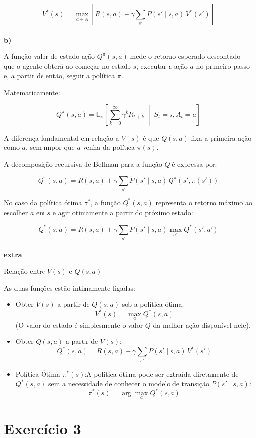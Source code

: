 \documentclass[a4paper,12pt]{article}
\begin{document}
$$V^*(s) = \max_{a \in A} \left[ R(s, a) + \gamma \sum_{s'} P(s' \mid s, a) \, V^*(s') \right]$$\\

\textbf{b)}

A função valor de estado-ação $Q^\pi(s, a)$ mede o retorno esperado descontado que o agente obterá ao começar no estado $s$, executar a ação $a$ no primeiro passo e, a partir de então, seguir a política $\pi$.

Matematicamente:

$$Q^\pi(s, a) = \mathbb{E}_\pi \left[ \sum_{k=0}^{\infty} \gamma^k R_{t+k} \;\middle\vert{}\; S_t = s, A_t = a \right]$$

A diferença fundamental em relação a $V(s)$ é que $Q(s,a)$ fixa a primeira ação como $a$, sem impor que $a$ venha da política $\pi(s)$.

A decomposição recursiva de Bellman para a função $Q$ é expressa por:

$$Q^\pi(s, a) = R(s, a) + \gamma \sum_{s'} P(s' \mid s, a) \, Q^\pi(s', \pi(s'))$$

No caso da política ótima $\pi^*$, a função $Q^*(s, a)$ representa o retorno máximo ao escolher $a$ em $s$ e agir otimamente a partir do próximo estado:

$$Q^*(s, a) = R(s, a) + \gamma \sum_{s'} P(s' \mid s, a) \max_{a'} Q^*(s', a')$$\\

\textbf{extra}

Relação entre $V(s)$ e $Q(s,a)$

As duas funções estão intimamente ligadas:
\begin{itemize}
	\item Obter $V(s)$ a partir de $Q(s,a)$ sob a política ótima:$$V^*(s) = \max_{a} Q^*(s, a)$$(O valor do estado é simplesmente o valor $Q$ da melhor ação disponível nele).
	\item Obter $Q(s,a)$ a partir de $V(s)$:$$Q^*(s, a) = R(s, a) + \gamma \sum_{s'} P(s' \mid s, a) \, V^*(s')$$
	\item Política Ótima $\pi^*(s)$:A política ótima pode ser extraída diretamente de $Q^*(s,a)$ sem a necessidade de conhecer o modelo de transição $P(s' \mid s, a)$:$$\pi^*(s) = \arg\max_{a} Q^*(s, a)$$
\end{itemize}


\section*{Exercício 3}
\end{document}
